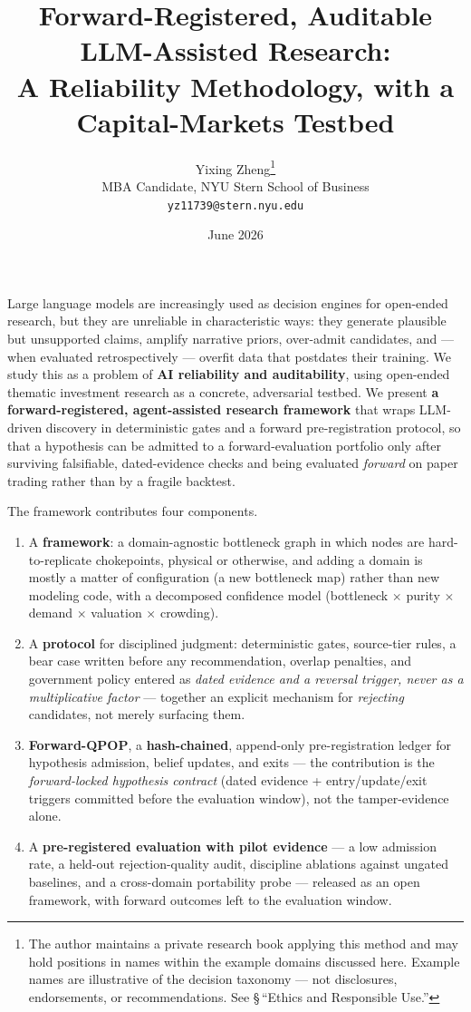 \documentclass[11pt]{article}
\title{Forward-Registered, Auditable LLM-Assisted Research:\\
A Reliability Methodology, with a Capital-Markets Testbed}
\author{Yixing Zheng\thanks{The author maintains a private research book applying this method and
may hold positions in names within the example domains discussed here. Example names are illustrative
of the decision taxonomy --- not disclosures, endorsements, or recommendations. See
\S\,``Ethics and Responsible Use.''}\\
MBA Candidate, NYU Stern School of Business\\
\texttt{yz11739@stern.nyu.edu}}
\date{June 2026}
\renewenvironment{abstract}{\begin{center}\bfseries\abstractname\end{center}\par\noindent\ignorespaces}{\par\medskip}
\begin{document}
\maketitle

\begin{abstract}
Large language models are increasingly used as decision engines for open-ended research, but they
are unreliable in characteristic ways: they generate plausible but unsupported claims, amplify
narrative priors, over-admit candidates, and --- when evaluated retrospectively --- overfit data
that postdates their training. We study this as a problem of \textbf{AI reliability and
auditability}, using open-ended thematic investment research as a concrete, adversarial testbed. We
present \textbf{a forward-registered, agent-assisted research framework} that wraps LLM-driven
discovery in deterministic gates and a forward pre-registration protocol, so that a hypothesis can
be admitted to a forward-evaluation portfolio only after surviving falsifiable, dated-evidence
checks and being evaluated \emph{forward} on paper trading rather than by a fragile backtest.

The framework contributes four components.
\begin{enumerate}
  \item A \textbf{framework}: a domain-agnostic bottleneck graph
    in which nodes are hard-to-replicate chokepoints, physical or otherwise, and adding a domain is mostly a matter of configuration
    (a new bottleneck map) rather than new modeling code, with
    a decomposed confidence model (bottleneck $\times$ purity $\times$ demand $\times$ valuation $\times$ crowding).
  \item A \textbf{protocol} for disciplined judgment: deterministic gates, source-tier rules, a bear case written
    before any recommendation, overlap penalties, and government policy entered as \emph{dated evidence and a
    reversal trigger, never as a multiplicative factor} --- together an explicit mechanism for \emph{rejecting}
    candidates, not merely surfacing them.
  \item \textbf{Forward-QPOP}, a \textbf{hash-chained}, append-only
    pre-registration ledger for hypothesis admission, belief updates, and exits --- the contribution is
    the \emph{forward-locked hypothesis contract} (dated evidence + entry/update/exit triggers committed
    before the evaluation window), not the tamper-evidence alone.
  \item A \textbf{pre-registered evaluation with pilot evidence} --- a low admission rate, a held-out
    rejection-quality audit, discipline ablations against ungated baselines, and a cross-domain portability
    probe --- released as an open framework, with forward outcomes left to the evaluation window.
\end{enumerate}


\end{abstract}
\end{document}
